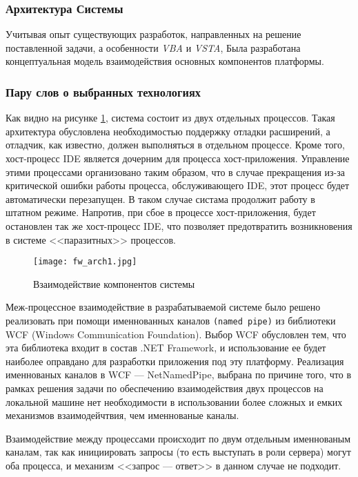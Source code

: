\subsubsection{Архитектура Системы}

Учитывая опыт существующих разработок, направленных на решение поставленной задачи, а особенности {\it VBA} и {\it VSTA}, Была разработана концептуальная модель взаимодействия основных компонентов платформы.

\subsubsection{Пару слов о выбранных технологиях}

Как видно на рисунке \ref{fw_arch1}, система состоит из двух отдельных процессов. Такая архитектура обусловлена необходимостью поддержку отладки расширений, а отладчик, как известно, должен выполняться в отдельном процессе. Кроме того, хост-процесс IDE является дочерним для процесса хост-приложения. Управление этими процессами организовано таким образом, что в случае прекращения из-за критической ошибки работы процесса, обслуживающего IDE, этот процесс будет автоматически перезапущен. В таком случае систама продолжит работу в штатном режиме. Напротив, при сбое в процессе хост-приложения, будет остановлен так же хост-процесс IDE, что позволяет предотвратить возникновения в системе <<паразитных>> процессов.

\begin{figure}[!h]
    \centering
    \texttt{[image: fw\_arch1.jpg]}
    \caption{Взаимодействие компонентов системы}
    \label{fw_arch1}
\end{figure}

Меж-процессное взаимодействие в разрабатываемой системе было решено реализовать при помощи именнованных каналов {\tt (named pipe)} из библиотеки WCF (Windows Communication Foundation). Выбор WCF обусловлен тем, что эта библиотека входит в состав .NET Framework, и использование ее будет наиболее оправдано для разработки приложения под эту платформу. Реализация именнованых каналов в WCF --- NetNamedPipe, выбрана по причине того, что в рамках решения задачи по обеспечению взаимодействия двух процессов на локальной машине нет необходимости в использовании более сложных и емких механизмов взаимодейчтвия, чем именнованые каналы.

Взаимодействие между процессами происходит по двум отдельным именнованым каналам, так как инициировать запросы (то есть выступать в роли сервера) могут оба процесса, и механизм <<запрос --- ответ>> в данном случае не подходит.

